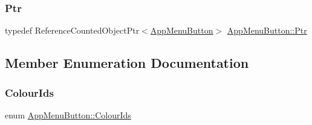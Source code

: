 \subsubsection{\texorpdfstring{Ptr}{Ptr}}
{\footnotesize\ttfamily typedef Reference\+Counted\+Object\+Ptr$<$\mbox{\hyperlink{classAppMenuButton}{App\+Menu\+Button}}$>$ \mbox{\hyperlink{classAppMenuButton_aeb692efb6a933970de8eac14e5e71544}{App\+Menu\+Button\+::\+Ptr}}}



\subsection{Member Enumeration Documentation}
\mbox{\label{classAppMenuButton_a9c81c78f6797058581b02308e25021f9}} 
\subsubsection{\texorpdfstring{Colour\+Ids}{ColourIds}}
{\footnotesize\ttfamily enum \mbox{\hyperlink{classAppMenuButton_a9c81c78f6797058581b02308e25021f9}{App\+Menu\+Button\+::\+Colour\+Ids}}}

